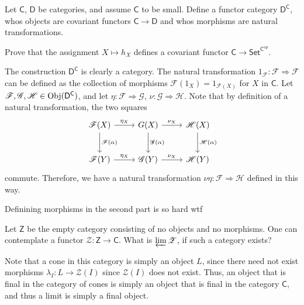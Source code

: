 \documentclass[11pt]{report}
\begin{document}
\begin{exercise}
	Let $\mathsf{C} $, $\mathsf{D} $ be categories, and assume $\mathsf{C} $ to be small. Define a functor category $\mathsf{D} ^{\mathsf{C} } $, whos objects are covariant functors $\mathsf{C}  \to \mathsf{D} $ and whos morphisms are natural transformations.

	Prove that the assignment $X\mapsto h_X$ defines a covariant functor $\mathsf{C} \to \mathsf{Set} ^{\mathsf{C} ^{op} } $.
\end{exercise}
\begin{solution}
	The construction $\mathsf{D} ^{\mathsf{C} } $ is clearly a category. The natural transformation $1_{\mathscr{F} } : \mathscr{F}  \Rightarrow \mathscr{F} $ can be defined as the collection of morphisms $\mathscr{F} (1_X)=1_{\mathscr{F} (X)} $ for $X$ in $\mathsf{C} $. Let $\mathscr{F} ,\mathscr{G} ,\mathscr{H} \in \operatorname{Obj}(\mathsf{D} ^{\mathsf{C} } ) $, and let $\eta : \mathscr{F}  \Rightarrow \mathscr{G} $, $\nu : \mathscr{G}  \Rightarrow \mathscr{H} $. Note that by definition of a natural transformation, the two squares
	\[\begin{tikzcd}[row sep = 2.5em, column sep = 2.5em]
		\mathscr{F} (X)\arrow[r, "\eta_X"]\arrow[d, "\mathscr{F} (\alpha )"]&G(X)\arrow[r, "\nu_X"]\arrow[d, "\mathscr{G} (\alpha )"]&\mathscr{H}(X) \arrow[d, "\mathscr{H} (\alpha )"]\\
		\mathscr{F} (Y)\arrow[r, "\eta_X"]&\mathscr{G} (Y)\arrow[r, "\nu _X"]&\mathscr{H} (Y)
	\end{tikzcd}\]
	commute. Therefore, we have a natural transformation $\nu \eta : \mathscr{F}  \Rightarrow \mathscr{H} $ defined in this way.

	Definining morphisms in the second part is so hard wtf
\end{solution}


\begin{exercise}
	Let $\mathsf{Z} $ be the empty category consisting of no objects and no morphisms. One can contemplate a functor $\mathscr{Z} : \mathsf{Z}  \to \mathsf{C} $. What is $\varprojlim \mathscr{Z} $, if such a category exists?
\end{exercise}
\begin{solution}
	Note that a cone in this category is simply an object $L$, since there need not exist morphisms $\lambda _I : L \to \mathscr{Z} (I)$ since $\mathscr{Z} \left( I \right) $ does not exist. Thus, an object that is final in the category of cones is simply an object that is final in the category $\mathsf{C} $, and thus a limit is simply a final object.
\end{solution}
\end{document}
